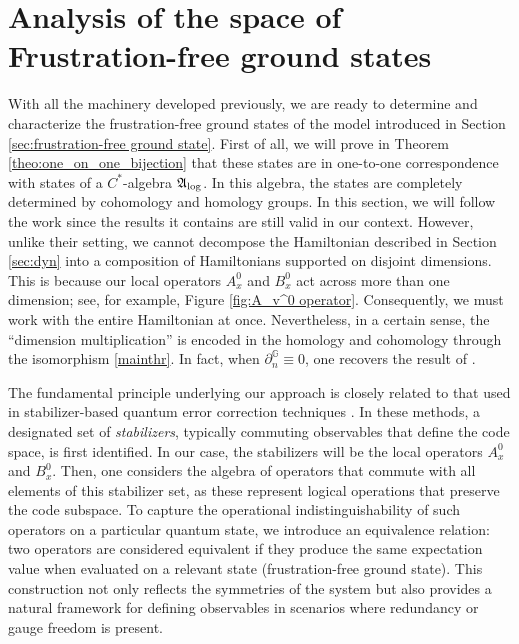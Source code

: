 \documentclass[a4paper,12pt,twoside,reqno]{amsart}
\theoremstyle{plain}
\theoremstyle{definition}
\theoremstyle{remark}
\numberwithin{equation}{section}
\numberwithin{figure}{section}
\numberwithin{table}{section}
\newcommand{\n}[1]{\mathbb{#1}}
\begin{document}
	
	
	
	
	\section{Analysis of the space of Frustration-free ground states}\label{sec:analysis}
	
	
	
	
	
	
	
	
	
	
	With all the machinery developed previously, we are ready to determine and characterize the frustration-free ground states of the model introduced in Section \ref{sec:frustration-free ground state}. First of all, we will prove in Theorem \ref{theo:one_on_one_bijection} that these states are in one-to-one correspondence with states of a $C^*$-algebra $\mathfrak{A}_{\rm log}$. In this algebra, the states are completely determined by cohomology and homology groups. In this section, we will follow the work \cite{Vrana} since the results it contains are still valid in our context. However, unlike their setting, we cannot decompose the Hamiltonian described in Section \ref{sec:dyn} into a composition of Hamiltonians supported on disjoint dimensions. This is because our local operators $A_x^0$ and $B_x^0$ act across more than one dimension; see, for example, Figure \ref{fig:A_v^0 operator}. Consequently, we must work with the entire Hamiltonian at once. Nevertheless, in a certain sense, the ``dimension multiplication'' is encoded in the homology and cohomology
	through the isomorphism \eqref{mainthr}. In fact, when $\partial^\n{G}_n \equiv 0$, one recovers the result of  \cite{Vrana}.
	
	
	
	
	
	
	\medskip
	
	
	
	
	The fundamental principle underlying our approach is closely related to that used in stabilizer-based quantum error correction techniques \cite{Fujii2015}. In these methods, a designated set of \emph{stabilizers}, typically commuting observables that define the code space, is first identified. In our case, the stabilizers will be the local operators $A_x^0$ and $B_x^0$.
	Then, one considers the algebra of operators that commute with all elements of this stabilizer set, as these represent logical operations that preserve the code subspace. To capture the operational indistinguishability of such operators on a particular quantum state, we introduce an equivalence relation: two operators are considered equivalent if they produce the same expectation value when evaluated on a relevant state (frustration-free ground state). This construction not only reflects the symmetries of the system but also provides a natural framework for defining observables in scenarios where redundancy or gauge freedom is present.
	
\end{document}
